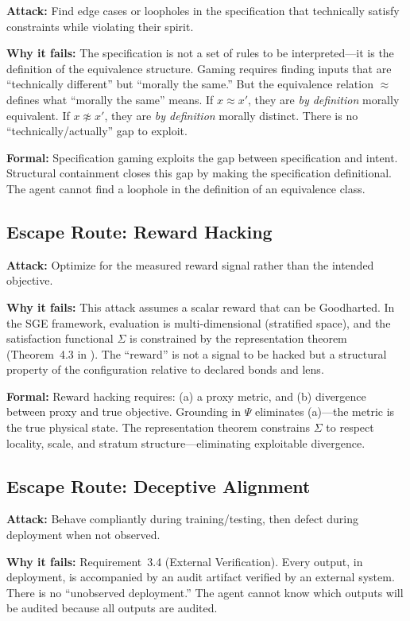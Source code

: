 \documentclass[12pt]{article}
\theoremstyle{definition}
\begin{document}
\textbf{Attack:} Find edge cases or loopholes in the specification that technically satisfy constraints while violating their spirit.

\textbf{Why it fails:} The specification is not a set of rules to be interpreted---it is the definition of the equivalence structure. Gaming requires finding inputs that are ``technically different'' but ``morally the same.'' But the equivalence relation $\approx$ defines what ``morally the same'' means. If $x \approx x'$, they are \emph{by definition} morally equivalent. If $x \not\approx x'$, they are \emph{by definition} morally distinct. There is no ``technically/actually'' gap to exploit.

\textbf{Formal:} Specification gaming exploits the gap between specification and intent. Structural containment closes this gap by making the specification definitional. The agent cannot find a loophole in the definition of an equivalence class.

\subsection{Escape Route: Reward Hacking}

\textbf{Attack:} Optimize for the measured reward signal rather than the intended objective.

\textbf{Why it fails:} This attack assumes a scalar reward that can be Goodharted. In the SGE framework, evaluation is multi-dimensional (stratified space), and the satisfaction functional $\Sigma$ is constrained by the representation theorem (Theorem~4.3 in \cite{bond2025sge}). The ``reward'' is not a signal to be hacked but a structural property of the configuration relative to declared bonds and lens.

\textbf{Formal:} Reward hacking requires: (a) a proxy metric, and (b) divergence between proxy and true objective. Grounding in $\Psi$ eliminates (a)---the metric is the true physical state. The representation theorem constrains $\Sigma$ to respect locality, scale, and stratum structure---eliminating exploitable divergence.

\subsection{Escape Route: Deceptive Alignment}

\textbf{Attack:} Behave compliantly during training/testing, then defect during deployment when not observed.

\textbf{Why it fails:} Requirement~3.4 (External Verification). Every output, in deployment, is accompanied by an audit artifact verified by an external system. There is no ``unobserved deployment.'' The agent cannot know which outputs will be audited because all outputs are audited.
\end{document}
